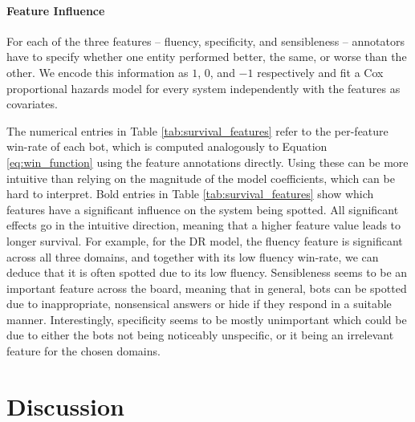 \documentclass[11pt,a4paper]{article}
\begin{document}
\paragraph{Feature Influence} For each of the three features -- fluency, specificity, and sensibleness -- annotators have to specify whether one entity performed better, the same, or worse than the other. We encode this information as $1$, $0$, and $-1$ respectively and fit a Cox proportional hazards model for every system independently with the features as covariates.

The numerical entries in Table \ref{tab:survival_features} refer to the per-feature win-rate of each bot, which is computed analogously to Equation \ref{eq:win_function} using the feature annotations directly. Using these can be more intuitive than relying on the magnitude of the model coefficients, which can be hard to interpret.
Bold entries in Table \ref{tab:survival_features} show which features have a significant influence on the system being spotted. All significant effects go in the intuitive direction, meaning that a higher feature value leads to longer survival.  For example, for the DR model, the fluency feature is significant across all three domains, and together with its low fluency win-rate, we can deduce that it is often spotted due to its low fluency. Sensibleness seems to be an important feature across the board, meaning that in general, bots can be spotted due to inappropriate, nonsensical answers or hide if they respond in a suitable manner. Interestingly, specificity seems to be mostly unimportant which could be due to either the bots not being noticeably unspecific, or it being an irrelevant feature for the chosen domains.

\section{Discussion}
\end{document}
